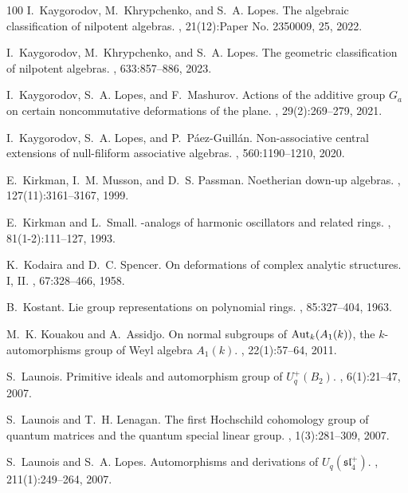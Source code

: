 \documentclass{commat}
\begin{document}
\begin{thebibliography}{100}
I.~Kaygorodov, M.~Khrypchenko, and S.~A. Lopes.
\newblock The algebraic classification of nilpotent algebras.
, 21(12):Paper No. 2350009, 25, 2022.

I.~Kaygorodov, M.~Khrypchenko, and S.~A. Lopes.
\newblock The geometric classification of nilpotent algebras.
, 633:857--886, 2023.

I.~Kaygorodov, S.~A. Lopes, and F.~Mashurov.
\newblock Actions of the additive group {$G_a$} on certain noncommutative
  deformations of the plane.
, 29(2):269--279, 2021.

I.~Kaygorodov, S.~A. Lopes, and P.~P\'{a}ez-Guill\'{a}n.
\newblock Non-associative central extensions of null-filiform associative
  algebras.
, 560:1190--1210, 2020.

E.~Kirkman, I.~M. Musson, and D.~S. Passman.
\newblock Noetherian down-up algebras.
, 127(11):3161--3167, 1999.

E.~Kirkman and L.~Small.
-analogs of harmonic oscillators and related rings.
, 81(1-2):111--127, 1993.

K.~Kodaira and D.~C. Spencer.
\newblock On deformations of complex analytic structures. {I}, {II}.
, 67:328--466, 1958.

B.~Kostant.
\newblock Lie group representations on polynomial rings.
, 85:327--404, 1963.

M.~K. Kouakou and A.~Assidjo.
\newblock On normal subgroups of {${\rm Aut}_k(A_1(k))$}, the
  {$k$}-automorphisms group of {W}eyl algebra {$A_1(k)$}.
, 22(1):57--64, 2011.

S.~Launois.
\newblock Primitive ideals and automorphism group of {$U^+_q(B_2)$}.
, 6(1):21--47, 2007.

S.~Launois and T.~H. Lenagan.
\newblock The first {H}ochschild cohomology group of quantum matrices and the
  quantum special linear group.
, 1(3):281--309, 2007.

S.~Launois and S.~A. Lopes.
\newblock Automorphisms and derivations of {$U_q(\mathfrak s\mathfrak l^+_4)$}.
, 211(1):249--264, 2007.


\end{thebibliography}
\end{document}
